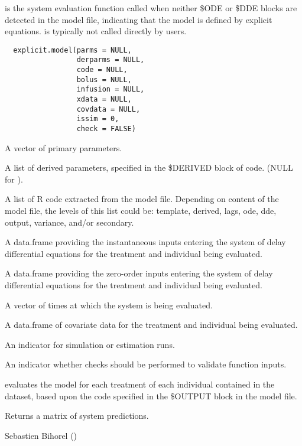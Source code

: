 %
\begin{Description}\relax
{} is the system evaluation function called when neither
\$ODE or \$DDE blocks are detected in the model file, indicating that the model
is defined by explicit equations.  is typically not 
called directly by users.
\end{Description}
%
\begin{Usage}
\begin{verbatim}
  explicit.model(parms = NULL,
                 derparms = NULL,
                 code = NULL,
                 bolus = NULL,
                 infusion = NULL,
                 xdata = NULL,
                 covdata = NULL,
                 issim = 0,
                 check = FALSE)
\end{verbatim}
\end{Usage}
%
\begin{Arguments}
\begin{ldescription}
\item[\code{parms}] A vector of primary parameters.
\item[\code{derparms}] A list of derived parameters, specified in the \$DERIVED block
of code. (NULL for ).
\item[\code{code}] A list of R code extracted from the model file. Depending on 
content of the model file, the levels of this list could be: template,
derived, lags, ode, dde, output, variance, and/or secondary.
\item[\code{bolus}] A data.frame providing the instantaneous inputs  entering the 
system of delay differential equations for the treatment and individual 
being evaluated.
\item[\code{infusion}] A data.frame providing the zero-order inputs entering the 
system of delay differential equations for the treatment and individual 
being evaluated.
\item[\code{xdata}] A vector of times at which the system is being evaluated.
\item[\code{covdata}] A data.frame of covariate data for the treatment and individual 
being evaluated.
\item[\code{issim}] An indicator for simulation or estimation runs.
\item[\code{check}] An indicator whether checks should be performed to validate 
function inputs.
\end{ldescription}
\end{Arguments}
%
\begin{Details}\relax
{} evaluates the model for each treatment of each 
individual contained in the dataset, based upon the code specified in the 
\$OUTPUT block in the model file.
\end{Details}
%
\begin{Value}
Returns a matrix of system predictions.
\end{Value}
%
\begin{Author}\relax
Sebastien Bihorel ()
\end{Author}
